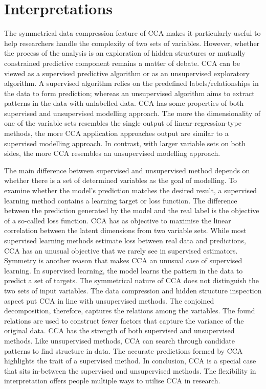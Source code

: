 \section{Interpretations}
\label{ch:methods:interpretations}
The symmetrical data compression feature of CCA makes it particularly useful to help researchers handle the complexity of two sets of variables. However, whether the process of the analysis is an exploration of hidden structures or mutually constrained predictive component remains a matter of debate. CCA can be viewed as a supervised predictive algorithm or as an unsupervised exploratory algorithm. A supervised algorithm relies on the predefined labels/relationships in the data to form prediction; whereas an unsupervised algorithm aims to extract patterns in the data with unlabelled data. CCA has some properties of both supervised and unsupervised modelling approach. The more the dimensionality of one of the variable sets resembles the single output of linear-regression-type methods, the more CCA application approaches output are similar to a supervised modelling approach. In contrast, with larger variable sets on both sides, the more CCA resembles an unsupervised modelling approach.

The main difference between supervised and unsupervised method depends on whether there is a set of determined variables as the goal of modelling. To examine whether the model’s prediction matches the desired result, a supervised learning method contains  a learning target or loss function. The difference between the prediction generated by the model and the real label is the objective of a so-called loss function. CCA has as objective to maximise the linear correlation between the latent dimensions from two variable sets. While most supervised learning methods estimate loss between real data and predictions, CCA has an unusual objective that we rarely see in supervised estimators.  Symmetry is another reason that makes CCA an unusual case of supervised learning. In supervised learning, the model learns the pattern in the data to predict a set of targets. The symmetrical nature of CCA does not distinguish the two sets of input variables. The data compression and hidden structure inspection aspect put CCA in line with unsupervised methods. The conjoined decomposition, therefore, captures the relations among the variables. The found relations are used to construct fewer factors that capture the variance of the original data. CCA has the strength of both supervised and unsupervised methods. Like unsupervised methods, CCA can search through candidate patterns to find structure in data. The accurate predictions formed by CCA highlights the trait of a supervised method. In conclusion, CCA is a special case that sits in-between the supervised and unsupervised methods. The flexibility in interpretation offers people multiple ways to utilise CCA in research.

